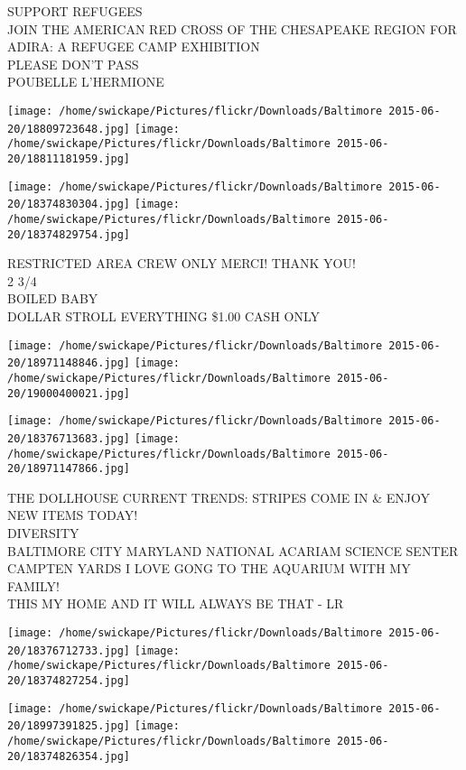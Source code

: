 \documentclass[10pt,letterpaper]{article}
\begin{document}
SUPPORT REFUGEES\\
JOIN THE AMERICAN RED CROSS OF THE CHESAPEAKE REGION FOR ADIRA: A REFUGEE CAMP EXHIBITION\\
PLEASE DON'T PASS\\
POUBELLE L'HERMIONE
\pagebreak

\texttt{[image: /home/swickape/Pictures/flickr/Downloads/Baltimore 2015-06-20/18809723648.jpg]}
\texttt{[image: /home/swickape/Pictures/flickr/Downloads/Baltimore 2015-06-20/18811181959.jpg]}

\texttt{[image: /home/swickape/Pictures/flickr/Downloads/Baltimore 2015-06-20/18374830304.jpg]}
\texttt{[image: /home/swickape/Pictures/flickr/Downloads/Baltimore 2015-06-20/18374829754.jpg]}

RESTRICTED AREA CREW ONLY MERCI!  THANK YOU!\\
2 3/4\\
BOILED BABY\\
DOLLAR STROLL EVERYTHING \$1.00 CASH ONLY
\pagebreak

\texttt{[image: /home/swickape/Pictures/flickr/Downloads/Baltimore 2015-06-20/18971148846.jpg]}
\texttt{[image: /home/swickape/Pictures/flickr/Downloads/Baltimore 2015-06-20/19000400021.jpg]}

\texttt{[image: /home/swickape/Pictures/flickr/Downloads/Baltimore 2015-06-20/18376713683.jpg]}
\texttt{[image: /home/swickape/Pictures/flickr/Downloads/Baltimore 2015-06-20/18971147866.jpg]}

THE DOLLHOUSE CURRENT TRENDS: STRIPES COME IN \& ENJOY NEW ITEMS TODAY!\\
DIVERSITY\\
BALTIMORE CITY MARYLAND NATIONAL ACARIAM SCIENCE SENTER CAMPTEN YARDS I LOVE GONG TO THE AQUARIUM WITH MY FAMILY!\\
THIS MY HOME AND IT WILL ALWAYS BE THAT {-} LR
\pagebreak

\texttt{[image: /home/swickape/Pictures/flickr/Downloads/Baltimore 2015-06-20/18376712733.jpg]}
\texttt{[image: /home/swickape/Pictures/flickr/Downloads/Baltimore 2015-06-20/18374827254.jpg]}

\texttt{[image: /home/swickape/Pictures/flickr/Downloads/Baltimore 2015-06-20/18997391825.jpg]}
\texttt{[image: /home/swickape/Pictures/flickr/Downloads/Baltimore 2015-06-20/18374826354.jpg]}
\end{document}
